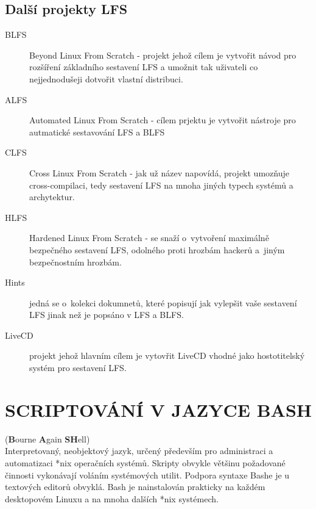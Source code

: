 \documentclass[a4paper,12pt]{article}
\newcommand{\upc}[1]{\uppercase{#1}}
\renewcommand{\b}[1]{\textbf{#1}} %
\begin{document}
\subsection{Další projekty LFS}
\begin{description}
 \item[BLFS] Beyond Linux From Scratch - projekt jehož cílem je vytvořit návod pro rozšíření základního sestavení LFS a umožnit tak uživateli co nejjednodušeji dotvořit vlastní distribuci.
 \item[ALFS] Automated Linux From Scratch - cílem prjektu je vytvořit nástroje pro autmatické sestavování LFS a BLFS
 \item[CLFS] Cross Linux From Scratch - jak už název napovídá, projekt umozňuje cross-compilaci, tedy sestavení LFS na mnoha jiných typech systémů a archytektur.
 \item[HLFS] Hardened Linux From Scratch - se snaží o~vytvoření maximálně bezpečného sestavení LFS, odolného proti hrozbám hackerů a~jiným bezpečnostním hrozbám.
 \item[Hints] jedná se o~kolekci dokumnetů, které popisují jak vylepšit vaše sestavení LFS jinak než je popsáno v LFS a BLFS.
 \item[LiveCD] projekt jehož hlavním cílem je vytovřit LiveCD vhodné jako hostotitelský systém pro sestavení LFS.
 \end{description}

\section{\upc{Scriptování v jazyce BASH}}
(\b{B}ourne \b{A}gain \b{SH}ell)\\
Interpretovaný, neobjektový jazyk, určený především pro administraci a automatizaci *nix operačních systémů. Skripty obvykle většinu požadované činnosti vykonávají voláním systémových utilit. Podpora syntaxe Bashe je u textových editorů obvyklá. Bash je nainstalován prakticky na každém desktopovém Linuxu a na mnoha dalších *nix systémech.\cite{ABCBASH}
\end{document}
